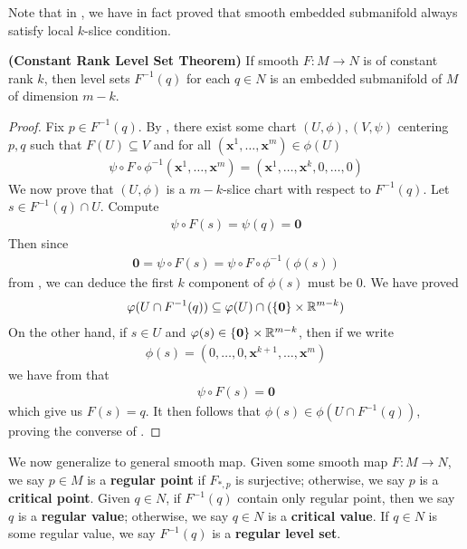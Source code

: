 \documentclass{report}
\begin{document}
\begin{mdframed}
Note that in , we have in fact proved that smooth embedded submanifold always satisfy local $k$-slice condition. 


\end{mdframed}
\begin{theorem}
\label{Constant Rank Level Set Theorem}
\textbf{(Constant Rank Level Set Theorem)} If smooth $F:M\rightarrow N$ is of constant rank $k$, then level sets  $F^{-1}(q)$ for each $q\in N$ is an embedded submanifold of $M$ of  dimension $m-k$. 
\end{theorem}
\begin{proof}
Fix $p \in F^{-1}(q)$. By , there exist some chart $(U,\phi),(V,\psi)$  centering $p,q$ such that  $F(U)\subseteq V$ and for all $(\textbf{x}^1,\dots ,\textbf{x}^m)\in \phi (U)$
\begin{align}
\label{psf}
\psi \circ F \circ \phi^{-1}(\textbf{x}^1,\dots ,\textbf{x}^m)= (\textbf{x}^1,\dots ,\textbf{x}^k,0,\dots ,0)
\end{align}
We now prove that $(U,\phi)$ is a  $m-k$-slice chart with respect to $F^{-1}(q)$. Let $s \in F^{-1}(q)\cap U$. Compute 
\begin{align*}
\psi \circ F(s)=\psi (q)=\textbf{0}
\end{align*}
Then since
\begin{align*}
\textbf{0}=\psi \circ F (s)= \psi \circ F \circ  \phi ^{-1}(\phi (s))
\end{align*}
from , we can deduce the first $k$ component of  $\phi (s)$ must be $0$. We have proved 
 \begin{align}
  \label{ucp}
   \varphi (U\cap F^{-1}(q))\subseteq \varphi (U)\cap (\{ \textbf{0} \}\times \mathbb{R}^{m-k})
\end{align}
On the other hand, if $s \in U$ and $\varphi (s)\in \{ \textbf{0} \}\times \mathbb{R}^{m-k}$, then if we write 
\begin{align*}
\phi (s)=(0,\dots ,0,\textbf{x}^{k+1},\dots ,\textbf{x}^m)
\end{align*}
we have from  that 
\begin{align*}
\psi \circ F (s)=\textbf{0}
\end{align*}
which give us $F(s)=q$. It then follows that $\phi (s)\in \phi (U \cap F^{-1}(q))$, proving the converse of . 
\end{proof}
\begin{mdframed}
  We now generalize  to general smooth map. Given some smooth map $F:M\rightarrow N$, we say $p \in M$ is a \textbf{regular point} if $F_{*,p}$ is surjective; otherwise, we say $p$ is a  \textbf{critical point}. Given  $q \in N$, if $F^{-1}(q)$ contain only regular point, then we say $q$ is a \textbf{regular value}; otherwise, we say $q \in N$ is a \textbf{critical value}. If $q \in N$ is some regular value, we say $F^{-1}(q)$ is a \textbf{regular level set}. 
\end{mdframed}
\end{document}

